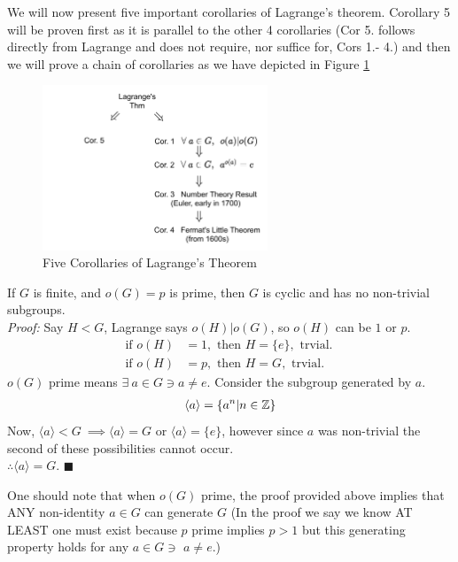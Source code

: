 We will now present five important corollaries of Lagrange's theorem. Corollary 5 will be proven first as it is parallel to the other 4 corollaries (Cor 5. follows directly from Lagrange and does not require, nor suffice for, Cors 1.- 4.) and then we will prove a chain of corollaries as we have depicted in Figure \ref{fig:Lagrange_corrs}
\begin{figure}[ht!]
    \centering
    \includegraphics[width=0.6\textwidth]{Figures/Lagrange_corrollaries.pdf}
    \vspace{-0.1in}\caption{Five Corollaries of Lagrange's Theorem}
    \label{fig:Lagrange_corrs}
\end{figure}
\newpage
\setcounter{dummy_lemma}{0}
\begin{corollary} 
If $G$ is finite, and $o(G)=p$ is prime, then $G$ is cyclic and has no non-trivial subgroups. \\
\textit{Proof:} Say $H<G$, Lagrange says $o(H)|o(G)$, so $o(H)$ can be $1$ or $p$.
\begin{align}
    \text{if }o(H)&=1, \text{ then } H=\{e\}, \text{ trvial.} \ \nonumber\\
    \text{if }o(H)&=p, \text{ then } H=G, \text{ trvial.} \ \nonumber
\end{align}
$o(G)$ prime means $\exists \ a\in G\ni a\neq e$. Consider the subgroup generated by $a$.
\begin{align}
    \langle a \rangle= \{a^n|n\in {\mathbb{ Z}}\}\nonumber
\end{align}
Now, $\langle a \rangle < G \ \implies \langle a \rangle= G$ or $\langle a \rangle =\{e \}$, however since $a$ was non-trivial the second of these possibilities cannot occur.\\
$\therefore \langle a \rangle = G$. $\blacksquare$
\end{corollary}
One should note that when $o(G)$ prime, the proof provided above implies that ANY non-identity $a\in G$ can generate $G$ (In the proof we say we know AT LEAST one must exist because $p$ prime implies $p>1$ but this generating property holds for any $a\in G\ni$  $a\neq e$.)

